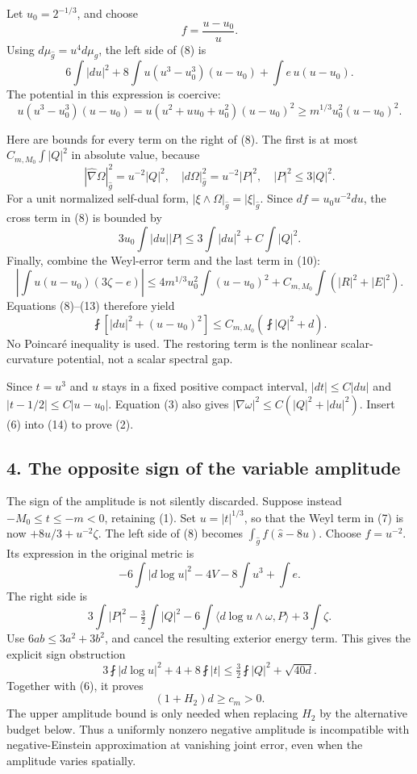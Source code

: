 \documentclass[
  11pt,
]{article}
\begin{document}
Let \(u_0=2^{-1/3}\), and choose \[
                     f=\frac{u-u_0}{u}.
\tag{9}
\] Using \(d\mu_{\widehat g}=u^4d\mu_g\), the left side of (8) is \[
 6\int|du|^2
 +8\int u(u^3-u_0^3)(u-u_0)
 +\int e\,u(u-u_0).
\tag{10}
\] The potential in this expression is coercive: \[
 u(u^3-u_0^3)(u-u_0)
 =u(u^2+uu_0+u_0^2)(u-u_0)^2
 \ge m^{1/3}u_0^2(u-u_0)^2.
\tag{11}
\]

Here are bounds for every term on the right of (8). The first is at most
\(C_{m,M_0}\int|Q|^2\) in absolute value, because \[
 |\widehat\nabla\Omega|_{\widehat g}^2=u^{-2}|Q|^2,
 \quad |d\Omega|_{\widehat g}^2=u^{-2}|P|^2,
 \quad |P|^2\le3|Q|^2.
\] For a unit normalized self-dual form,
\(|\xi\wedge\Omega|_{\widehat g}=|\xi|_{\widehat g}\). Since
\(df=u_0u^{-2}du\), the cross term in (8) is bounded by \[
 3u_0\int|du||P|
 \le 3\int|du|^2+C\int|Q|^2.
\tag{12}
\] Finally, combine the Weyl-error term and the last term in (10): \[
 \left|\int u(u-u_0)(3\zeta-e)\right|
 \le 4m^{1/3}u_0^2\int(u-u_0)^2
       +C_{m,M_0}\int(|R|^2+|E|^2).
\tag{13}
\] Equations (8)--(13) therefore yield \[
 \fint\left[|du|^2+(u-u_0)^2\right]
 \le C_{m,M_0}\left(\fint|Q|^2+d\right).
\tag{14}
\] No Poincaré inequality is used. The restoring term is the nonlinear
scalar-curvature potential, not a scalar spectral gap.

Since \(t=u^3\) and \(u\) stays in a fixed positive compact interval,
\(|dt|\le C|du|\) and \(|t-1/2|\le C|u-u_0|\). Equation (3) also gives
\(|\nabla\omega|^2\le C(|Q|^2+|du|^2)\). Insert (6) into (14) to prove
(2).

\hypertarget{the-opposite-sign-of-the-variable-amplitude}{%
\subsection{4. The opposite sign of the variable
amplitude}\label{the-opposite-sign-of-the-variable-amplitude}}

The sign of the amplitude is not silently discarded. Suppose instead
\(-M_0\le t\le-m<0\), retaining (1). Set \(u=|t|^{1/3}\), so that the
Weyl term in (7) is now \(+8u/3+u^{-2}\zeta\). The left side of (8)
becomes \(\int_{\widehat g}f(\widehat s-8u)\). Choose \(f=u^{-2}\). Its
expression in the original metric is \[
 -6\int|d\log u|^2-4V-8\int u^3+\int e.
\] The right side is \[
 3\int|P|^2-\tfrac32\int|Q|^2
 -6\int\langle d\log u\wedge\omega,P\rangle+3\int\zeta.
\] Use \(6ab\le3a^2+3b^2\), and cancel the resulting exterior energy
term. This gives the explicit sign obstruction \[
 3\fint|d\log u|^2+4+8\fint|t|
 \le\tfrac32\fint|Q|^2+\sqrt{40d}.
\] Together with (6), it proves \[
 \boxed{(1+H_2)d\ge c_m>0.}                    \tag{14a}
\] The upper amplitude bound is only needed when replacing \(H_2\) by
the alternative budget below. Thus a uniformly nonzero negative
amplitude is incompatible with negative-Einstein approximation at
vanishing joint error, even when the amplitude varies spatially.
\end{document}
